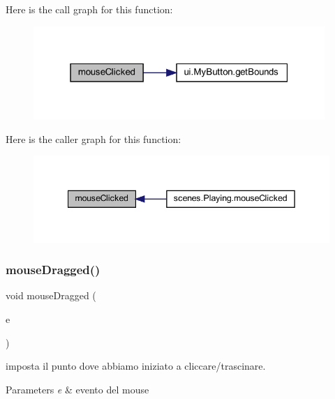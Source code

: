 Here is the call graph for this function\+:\nopagebreak
\begin{figure}[H]
\begin{center}
\leavevmode
\includegraphics[width=313pt]{classui_1_1_level_menu_a45d56bd84238e8b56589dfc732e2b2cf_cgraph}
\end{center}
\end{figure}
Here is the caller graph for this function\+:\nopagebreak
\begin{figure}[H]
\begin{center}
\leavevmode
\includegraphics[width=342pt]{classui_1_1_level_menu_a45d56bd84238e8b56589dfc732e2b2cf_icgraph}
\end{center}
\end{figure}
\mbox{\label{classui_1_1_level_menu_adbfc0588c017133c9b7070474402b72f}} 
\subsubsection{\texorpdfstring{mouse\+Dragged()}{mouseDragged()}}
{\footnotesize\ttfamily void mouse\+Dragged (\begin{DoxyParamCaption}\item[{Mouse\+Event}]{e }\end{DoxyParamCaption})}



imposta il punto dove abbiamo iniziato a cliccare/trascinare. 


\begin{DoxyParams}{Parameters}
{\em e} & evento del mouse \\
\hline
\end{DoxyParams}


